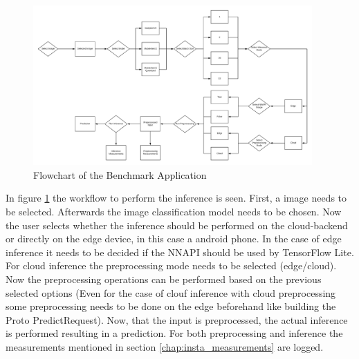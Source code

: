 \begin{figure}[H]
\centering
\includegraphics[width=0.95\textwidth]{./Bilder/FlowChart_App.png}
\caption{Flowchart of the Benchmark Application}
\label{fig:app}
\end{figure}
In figure \ref{fig:app} the workflow to perform the inference is seen. First, a image needs to be selected. Afterwards the image classification model needs to be chosen. Now the user selects whether the inference should be performed on the cloud-backend or directly on the edge device, in this case a android phone. In the case of edge inference it needs to be decided if the NNAPI should be used by TensorFlow Lite. For cloud inference the preprocessing mode needs to be selected (edge/cloud). Now the preprocessing operations can be performed based on the previous selected options (Even for the case of clouf inference with cloud preprocessing some preprocessing needs to be done on the edge beforehand like building the Proto PredictRequest). Now, that the input is preprocessed, the actual inference is performed resulting in a prediction. For both preprocessing and inference the measurements mentioned in section \ref{chap:insta_measurements} are logged.

